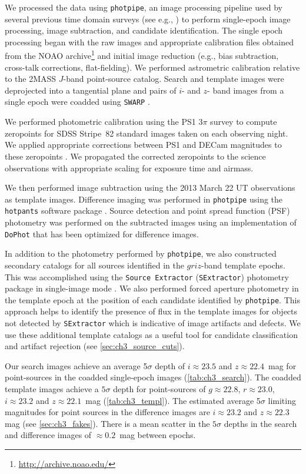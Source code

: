 \clearpage
We processed the data using {\tt photpipe}, an image processing pipeline used by several previous time domain surveys (see e.g., \citealt{Rest+05,Rest+14}) to perform single-epoch image processing, image subtraction, and candidate identification. The single epoch processing began with the raw images and appropriate calibration files obtained from the NOAO archive\footnote{\url{http://archive.noao.edu/}} and initial image reduction (e.g., bias subtraction, cross-talk corrections, flat-fielding). We performed astrometric calibration relative to the 2MASS $J$-band point-source catalog. Search and template images were deprojected into a tangential plane and pairs of $i$- and $z$- band images from a single epoch were coadded using {\tt SWARP} \citep{Bertin+02}.

We performed photometric calibration using the PS1 3$\pi$ survey to compute zeropoints for SDSS Stripe~82 standard images taken on each observing night. We applied appropriate corrections between PS1 and DECam magnitudes to these zeropoints \citep{Scolnic+15}. We propagated the corrected zeropoints to the science observations with appropriate scaling for exposure time and airmass.

We then performed image subtraction using the 2013 March 22 UT observations as template images. Difference imaging was performed in {\tt photpipe} using the {\tt hotpants} software package \citep{Alard2000,Becker2015}. Source detection and point spread function (PSF) photometry was performed on the subtracted images using an implementation of {\tt DoPhot} \citep{Schechter+93} that has been optimized for difference images.

\clearpage
In addition to the photometry performed by {\tt photpipe}, we also constructed secondary catalogs for all sources identified in the $griz$-band template epochs. This was accomplished using the {\tt Source Extractor} ({\tt SExtractor}) photometry package in single-image mode \citep{BertinArnouts96}. We also performed forced aperture photometry in the template epoch at the position of each candidate identified by {\tt photpipe}. This approach helps to identify the presence of flux in the template images for objects not detected by {\tt SExtractor} which is indicative of image artifacts and defects. We use these additional template catalogs as a useful tool for candidate classification and artifact rejection (see \cref{sec:ch3_source_cuts}).

Our search images achieve an average 5$\sigma$ depth of $i \approx 23.5$ and $z \approx 22.4$~mag for point-sources in the coadded single-epoch images (\cref{tab:ch3_search}). The coadded template images achieve a $5\sigma$ depth for point-sources of $g \approx 22.8$, $r \approx 23.0$, $i \approx 23.2$ and $z \approx 22.1$~mag (\cref{tab:ch3_templ}). The estimated average 5$\sigma$ limiting magnitudes for point sources in the difference images are $i \approx 23.2$ and $z \approx 22.3$ mag (see \cref{sec:ch3_fakes}). There is a mean scatter in the $5\sigma$ depths in the search and difference images of $\approx 0.2$~mag between epochs.

